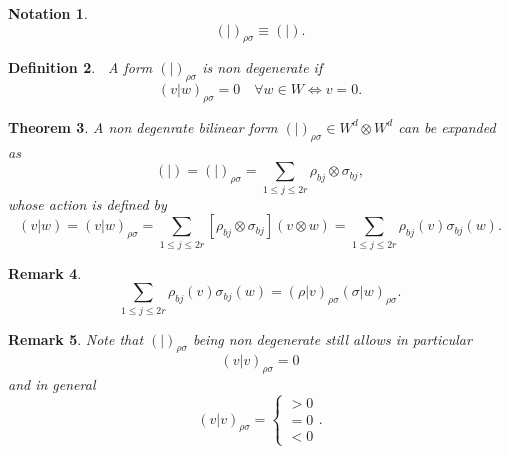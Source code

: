 \documentclass[aps,preprint]{revtex4}
\newtheorem{theorem}{Theorem}
\newtheorem{definition}[theorem]{Definition}
\newtheorem{notation}[theorem]{Notation}
\newtheorem{remark}[theorem]{Remark}
\begin{document}
\begin{notation}
\begin{equation}
\left( \left. {}\right\vert \right) _{\rho \sigma }\equiv \left( \left.
{}\right\vert \right) .
\end{equation}
\end{notation}

\begin{definition}
\textbf{\ }A form $\left( \left. {}\right\vert \right) _{\rho \sigma }$ is
non degenerate if 
\begin{equation}
\left( \left. v\right\vert w\right) _{\rho \sigma }=0\quad \forall w\in
W\Leftrightarrow v=0.
\end{equation}
\end{definition}

\begin{theorem}
A non degenrate bilinear form $\left( \left. {}\right\vert \right) _{\rho
\sigma }\in W^{d}\otimes W^{d}$ can be expanded as 
\begin{equation}
\left( \left. {}\right\vert \right) =\left( \left. {}\right\vert \right)
_{\rho \sigma }=\sum_{1\leq j\leq 2r}\rho _{bj}\otimes \sigma _{bj},
\end{equation}%
whose action is defined by 
\begin{equation}
\left( \left. v\right\vert w\right) =\left( \left. v\right\vert w\right)
_{\rho \sigma }=\sum_{1\leq j\leq 2r}\left[ \overset{}{\rho _{bj}\otimes
\sigma _{bj}}\right] \left( v\otimes w\right) =\sum_{1\leq j\leq 2r}\rho
_{bj}\left( v\right) \sigma _{bj}\left( w\right) .
\end{equation}
\end{theorem}

\begin{remark}
\begin{equation}
\sum_{1\leq j\leq 2r}\rho _{bj}\left( v\right) \sigma _{bj}\left( w\right)
=\left( \left. \rho \right\vert v\right) _{\rho \sigma }\left( \left. \sigma
\right\vert w\right) _{\rho \sigma }.
\end{equation}
\end{remark}

\begin{remark}
Note that $\left( \left. {}\right\vert \right) _{\rho \sigma }$ being non
degenerate still allows in particular 
\begin{equation}
\left( \left. v\right\vert v\right) _{\rho \sigma }=0
\end{equation}%
and in general 
\begin{equation}
\left( \left. v\right\vert v\right) _{\rho \sigma }=\left\{ 
\begin{array}{c}
>0 \\ 
=0 \\ 
<0%
\end{array}%
\right. .
\end{equation}
\end{remark}
\end{document}

